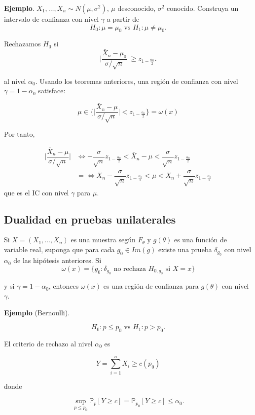 \documentclass[
  12pt,
]{book}
\begin{document}
\textbf{Ejemplo}. \(X_1,\dots,X_n\sim N(\mu,\sigma^2)\), \(\mu\) desconocido, \(\sigma^2\) conocido. Construya un intervalo de confianza con nivel \(\gamma\) a partir de \[ H_0: \mu = \mu_0 \text{ vs } H_1: \mu \ne \mu_0.\]

Rechazamos \(H_0\) si
\[\bigg|\dfrac{\bar X_n-\mu_0}{\sigma/\sqrt n}\bigg|\geq z_{1-\frac{\alpha_0}2}.\]

al nivel \(\alpha_0\). Usando los teoremas anteriores, una región de confianza con nivel \(\gamma = 1-\alpha_0\) satisface:

\[\mu\in\bigg\{ \bigg|\dfrac{\bar X_n-\mu}{\sigma/\sqrt n}\bigg|< z_{1-\frac{\alpha_0}2}\bigg\} = \omega(x)\]

Por tanto,

\begin{align*}
 \bigg|\dfrac{\bar X_n-\mu}{\sigma/\sqrt n}\bigg| & \Leftrightarrow -\dfrac{\sigma}{\sqrt n}z_{1-\frac{\alpha_0}2}<\bar X_n  - \mu<\dfrac{\sigma}{\sqrt n}z_{1-\frac{\alpha_0}2}\\
 & = \Leftrightarrow \bar X_n-\dfrac{\sigma}{\sqrt n}z_{1-\frac{\alpha_0}2}< \mu<\bar X_n + \dfrac{\sigma}{\sqrt n}z_{1-\frac{\alpha_0}2}
\end{align*}
que es el IC con nivel \(\gamma\) para \(\mu\).

\hypertarget{dualidad-en-pruebas-unilaterales}{%
\subsection{Dualidad en pruebas unilaterales}\label{dualidad-en-pruebas-unilaterales}}

Si \(X = (X_1,\dots, X_n)\) es una muestra según \(F_\theta\) y \(g(\theta)\) es una función de variable real, suponga que para cada \(g_0\in Im(g)\) existe una prueba \(\delta_{g_0}\) con nivel \(\alpha_0\) de las hipótesis anteriores. Si
\[\omega(x) = \{g_0: \delta_{g_0} \text{ no rechaza }H_{0,g_0}\text{ si }X=x\}\]

y si \(\gamma = 1-\alpha_0\), entonces \(\omega(x)\) es una región de confianza para \(g(\theta)\) con nivel \(\gamma\).

\textbf{Ejemplo} (Bernoulli).

\[ H_0: p \leq p_0 \text{ vs } H_1: p>p_0.\]

El criterio de rechazo al nivel \(\alpha_0\) es

\[Y = \sum_{i=1}^nX_i\geq c(p_0)\]

donde

\[\sup_{p\leq p_0} \mathbb P_p[Y\geq c] = \mathbb P_{p_0}[Y\geq c] \leq \alpha_0.\]
\end{document}
